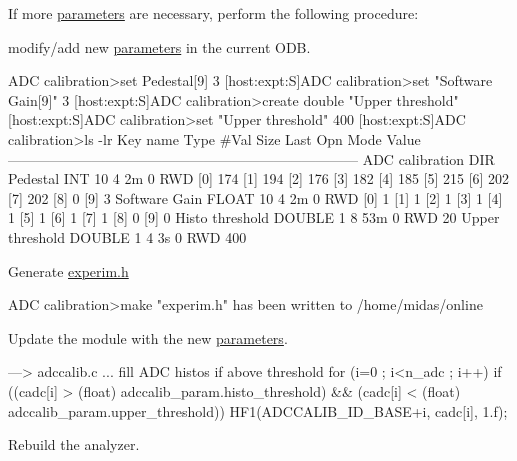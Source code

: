 If more \hyperlink{structparameters}{parameters} are necessary, perform the following procedure:
\begin{DoxyEnumerate}
\item modify/add new \hyperlink{structparameters}{parameters} in the current ODB. 
\begin{DoxyCode}
ADC calibration>set Pedestal[9] 3
[host:expt:S]ADC calibration>set "Software Gain[9]" 3
[host:expt:S]ADC calibration>create double "Upper threshold"
[host:expt:S]ADC calibration>set "Upper threshold" 400
[host:expt:S]ADC calibration>ls -lr
Key name                        Type    #Val  Size  Last Opn Mode Value
---------------------------------------------------------------------------
ADC calibration                 DIR
    Pedestal                    INT     10    4     2m   0   RWD
                                        [0]             174
                                        [1]             194
                                        [2]             176
                                        [3]             182
                                        [4]             185
                                        [5]             215
                                        [6]             202
                                        [7]             202
                                        [8]             0
                                        [9]             3
    Software Gain               FLOAT   10    4     2m   0   RWD
                                        [0]             1
                                        [1]             1
                                        [2]             1
                                        [3]             1
                                        [4]             1
                                        [5]             1
                                        [6]             1
                                        [7]             1
                                        [8]             0
                                        [9]             0
    Histo threshold             DOUBLE  1     8     53m  0   RWD  20
    Upper threshold             DOUBLE  1     4     3s   0   RWD  400
\end{DoxyCode}

\item Generate \hyperlink{experim_8h}{experim.h} 
\begin{DoxyCode}
ADC calibration>make
"experim.h" has been written to /home/midas/online
\end{DoxyCode}

\item Update the module with the new \hyperlink{structparameters}{parameters}. 
\begin{DoxyCode}
---> adccalib.c
...
fill ADC histos if above threshold 
for (i=0 ; i<n_adc ; i++)
if ((cadc[i] > (float) adccalib_param.histo_threshold)
 && (cadc[i] < (float) adccalib_param.upper_threshold))
    HF1(ADCCALIB_ID_BASE+i, cadc[i], 1.f);
\end{DoxyCode}

\item Rebuild the analyzer.
\end{DoxyEnumerate}


